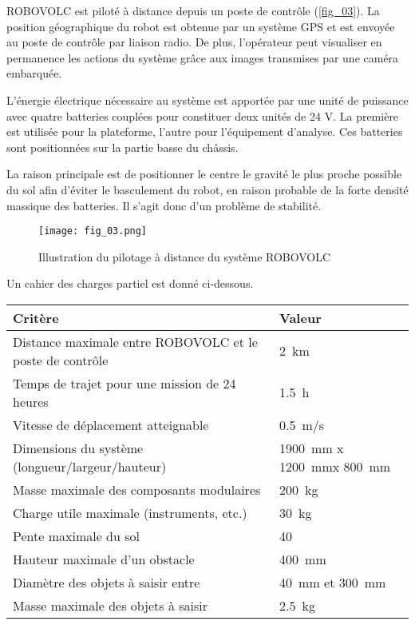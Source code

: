\ifprof
\else
ROBOVOLC est piloté à distance depuis un poste de contrôle (\autoref{fig_03}). La position géographique
du robot est obtenue par un système GPS et est envoyée au poste de contrôle par liaison radio.
De plus, l’opérateur peut visualiser en permanence les actions du système grâce aux images
transmises par une caméra embarquée.

L'énergie électrique nécessaire au système est apportée par une unité de puissance avec quatre
batteries couplées pour constituer deux unités de 24 V. La première est utilisée pour la plateforme,
l'autre pour l'équipement d'analyse. Ces batteries sont positionnées sur la partie basse du châssis.
\fi

\ifprof
\begin{corrige}
 La raison principale est de positionner le centre le gravité le plus proche possible du sol afin d’éviter le basculement du robot, en raison probable de la forte densité massique des batteries. Il s’agit donc d’un problème de stabilité.
\end{corrige}
\else
\fi


\ifprof
\else
\begin{figure}[H]
\centering
\texttt{[image: fig\_03.png]}
\caption{Illustration du pilotage à distance du système ROBOVOLC\label{fig_03}}
\end{figure}

Un cahier des charges partiel est donné ci-dessous.

\begin{center}
\begin{tabular}{ll}
\hline
\textbf{Critère} & \textbf{Valeur} \\ \hline 
Distance maximale entre ROBOVOLC et le poste de contrôle & \SI{2}{km} \\ 
Temps de trajet pour une mission de 24 heures 		& \SI{1,5}{h} \\  
Vitesse de déplacement atteignable 				& \SI{0,5}{m/s} \\
Dimensions du système (longueur/largeur/hauteur) 		& \SI{1900}{mm} x \SI{1200}{mm}x \SI{800}{mm}\\ 
Masse maximale des composants modulaires 			& \SI{200}{kg} \\ 
Charge utile maximale (instruments, etc.) 			& \SI{30}{kg} \\ 
Pente maximale du sol 						& 40\degres \\ 
Hauteur maximale d'un obstacle 					& \SI{400}{mm} \\
Diamètre des objets à saisir entre 				& \SI{40}{mm} et \SI{300}{mm} \\ 
Masse maximale des objets à saisir 				& \SI{2,5}{kg} \\ \hline 
\end{tabular}
\end{center}

